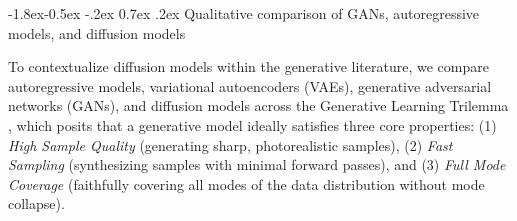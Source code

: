 \documentclass[10pt,a4paper]{article}
\makeatletter
\renewcommand\subsection{\@startsection{subsection}{2}{\z@}%
                                     {-1.8ex\@plus -0.5ex \@minus -.2ex}%
                                     {0.7ex \@plus .2ex}%
                                     {\normalfont\normalsize\bfseries}}
\makeatother
\begin{document}
\subsection{Qualitative comparison of GANs, autoregressive models, and diffusion models}
\label{sec:bg_trilemma}

To contextualize diffusion models within the generative literature, we compare autoregressive models, variational autoencoders (VAEs), generative adversarial networks (GANs), and diffusion models across the Generative Learning Trilemma \cite{xiao2022tackling}, which posits that a generative model ideally satisfies three core properties: (1) \textit{High Sample Quality} (generating sharp, photorealistic samples), (2) \textit{Fast Sampling} (synthesizing samples with minimal forward passes), and (3) \textit{Full Mode Coverage} (faithfully covering all modes of the data distribution without mode collapse).
\end{document}
